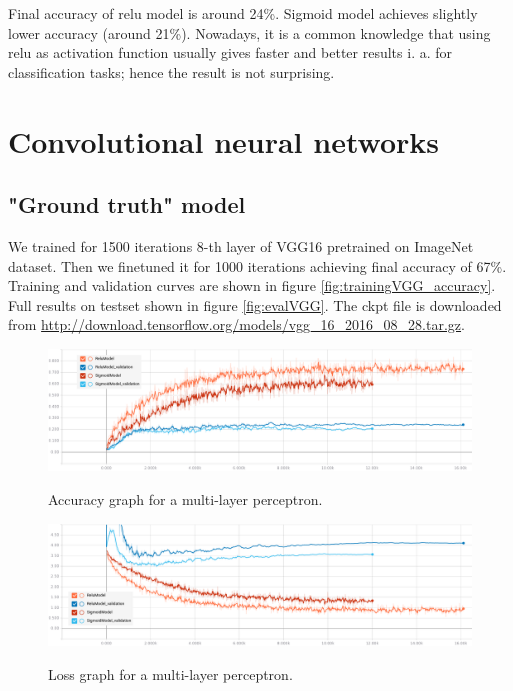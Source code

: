 \documentclass[a4paper]{article}
\begin{document}
\begin{multicols}{2}
Final accuracy of relu model is around 24\%.
Sigmoid model achieves slightly lower accuracy (around 21\%).
Nowadays, it is a common knowledge that using relu as activation function
usually gives faster and better results i. a. for classification tasks;
hence the result is not surprising.





\section{Convolutional neural networks}

\subsection{"Ground truth" model}

We trained for 1500 iterations 8-th layer of VGG16\cite{VGG16}
pretrained on ImageNet\cite{ImageNet} dataset.
Then we finetuned it for 1000 iterations achieving final accuracy of 67\%.
Training and validation curves are shown in figure \ref{fig:trainingVGG_accuracy}. %
Full results on testset shown in figure \ref{fig:evalVGG}.
The ckpt file is downloaded from \url{http://download.tensorflow.org/models/vgg_16_2016_08_28.tar.gz}.

\end{multicols}

\begin{figure}[h]
    \caption[]{Accuracy graph for a multi-layer perceptron.}
    \centering
    \includegraphics[page=2,width=1.0\textwidth]{training_accuracy.png}
    \label{fig:training_accuracy}
\end{figure}

\begin{figure}[h]
    \caption[]{Loss graph for a multi-layer perceptron.}
    \centering
    \includegraphics[page=2,width=1.0\textwidth]{training_loss.png}
    \label{fig:training_loss}
\end{figure}
\end{document}
